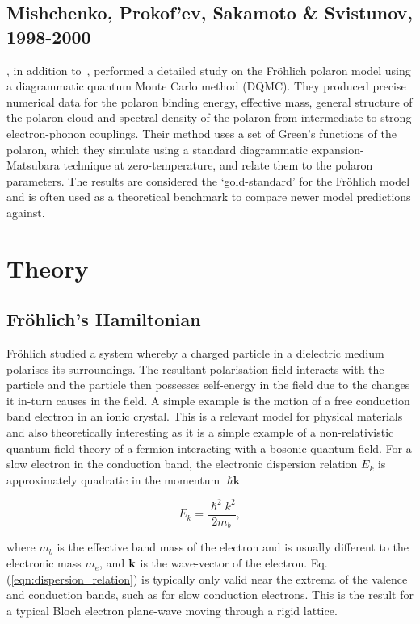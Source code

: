 \subsection{Mishchenko, Prokof’ev, Sakamoto \& Svistunov, 1998-2000}

\cite{prokofev_polaron_1998}, in addition to~\cite{mishchenko_diagrammatic_2000}, performed a detailed study on the Fr\"ohlich polaron model using a diagrammatic quantum Monte Carlo method (DQMC). They produced precise numerical data for the polaron binding energy, effective mass, general structure of the polaron cloud and spectral density of the polaron from intermediate to strong electron-phonon couplings. Their method uses a set of Green's functions of the polaron, which they simulate using a standard diagrammatic expansion-Matsubara technique at zero-temperature, and relate them to the polaron parameters. The results are considered the `gold-standard' for the Fr\"ohlich model and is often used as a theoretical benchmark to compare newer model predictions against. 

\section{Theory}

\subsection{Fr\"ohlich's Hamiltonian}

Fr\"ohlich studied a system whereby a charged particle in a dielectric medium polarises its surroundings. The resultant polarisation field interacts with the particle and the particle then possesses self-energy in the field due to the changes it in-turn causes in the field. A simple example is the motion of a free conduction band electron in an ionic crystal. This is a relevant model for physical materials and also theoretically interesting as it is a simple example of a non-relativistic quantum field theory of a fermion interacting with a bosonic quantum field. For a slow electron in the conduction band, the electronic dispersion relation $E_k$ is approximately quadratic in the momentum $\hslash \textbf{k}$ 

\begin{equation}
    E_k = \frac{\hslash^2 k^2}{2 m_b},
\label{eqn:dispersion_relation}
\end{equation}

where $m_b$ is the effective band mass of the electron and is usually different to the electronic mass $m_e$, and $\vb{k}$ is the wave-vector of the electron. Eq. (\ref{eqn:dispersion_relation}) is typically only valid near the extrema of the valence and conduction bands, such as for slow conduction electrons. This is the result for a typical Bloch electron plane-wave moving through a rigid lattice.  

